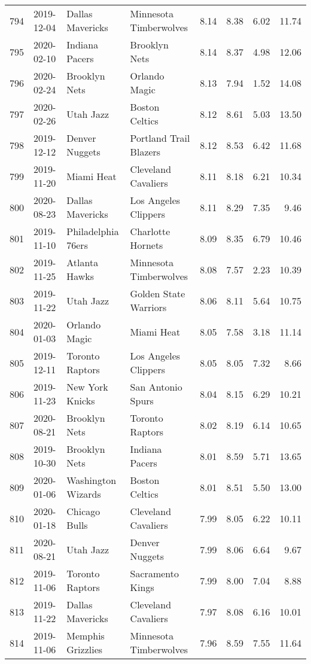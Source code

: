 \documentclass[
  11pt,
]{article}
\theoremstyle{nonumberplain}
\begin{document}
\begin{longtable}{rl|llr|rrr}
794 & 2019-12-04 & Dallas Mavericks & Minnesota Timberwolves & 8.14 & 8.38 & 6.02 & 11.74\\
795 & 2020-02-10 & Indiana Pacers & Brooklyn Nets & 8.14 & 8.37 & 4.98 & 12.06\\
796 & 2020-02-24 & Brooklyn Nets & Orlando Magic & 8.13 & 7.94 & 1.52 & 14.08\\
797 & 2020-02-26 & Utah Jazz & Boston Celtics & 8.12 & 8.61 & 5.03 & 13.50\\
798 & 2019-12-12 & Denver Nuggets & Portland Trail Blazers & 8.12 & 8.53 & 6.42 & 11.68\\
799 & 2019-11-20 & Miami Heat & Cleveland Cavaliers & 8.11 & 8.18 & 6.21 & 10.34\\
800 & 2020-08-23 & Dallas Mavericks & Los Angeles Clippers & 8.11 & 8.29 & 7.35 & 9.46\\
801 & 2019-11-10 & Philadelphia 76ers & Charlotte Hornets & 8.09 & 8.35 & 6.79 & 10.46\\
802 & 2019-11-25 & Atlanta Hawks & Minnesota Timberwolves & 8.08 & 7.57 & 2.23 & 10.39\\
803 & 2019-11-22 & Utah Jazz & Golden State Warriors & 8.06 & 8.11 & 5.64 & 10.75\\
804 & 2020-01-03 & Orlando Magic & Miami Heat & 8.05 & 7.58 & 3.18 & 11.14\\
805 & 2019-12-11 & Toronto Raptors & Los Angeles Clippers & 8.05 & 8.05 & 7.32 & 8.66\\
806 & 2019-11-23 & New York Knicks & San Antonio Spurs & 8.04 & 8.15 & 6.29 & 10.21\\
807 & 2020-08-21 & Brooklyn Nets & Toronto Raptors & 8.02 & 8.19 & 6.14 & 10.65\\
808 & 2019-10-30 & Brooklyn Nets & Indiana Pacers & 8.01 & 8.59 & 5.71 & 13.65\\
809 & 2020-01-06 & Washington Wizards & Boston Celtics & 8.01 & 8.51 & 5.50 & 13.00\\
810 & 2020-01-18 & Chicago Bulls & Cleveland Cavaliers & 7.99 & 8.05 & 6.22 & 10.11\\
811 & 2020-08-21 & Utah Jazz & Denver Nuggets & 7.99 & 8.06 & 6.64 & 9.67\\
812 & 2019-11-06 & Toronto Raptors & Sacramento Kings & 7.99 & 8.00 & 7.04 & 8.88\\
813 & 2019-11-22 & Dallas Mavericks & Cleveland Cavaliers & 7.97 & 8.08 & 6.16 & 10.01\\
814 & 2019-11-06 & Memphis Grizzlies & Minnesota Timberwolves & 7.96 & 8.59 & 7.55 & 11.64\\

\end{longtable}
\end{document}

